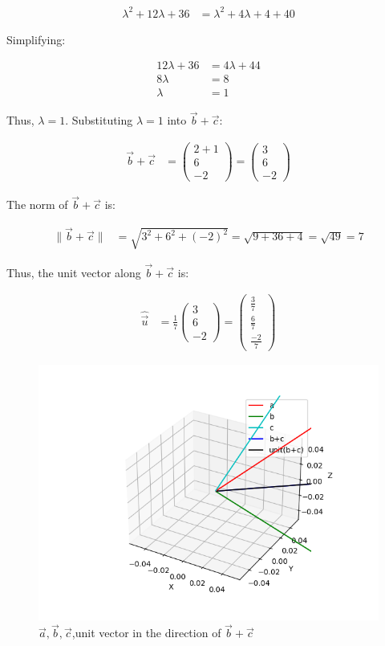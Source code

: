 \documentclass[journal]{IEEEtran}
\numberwithin{equation}{enumi}
\numberwithin{figure}{enumi}
\begin{document}
\begin{align}
\lambda^2 + 12\lambda + 36 &= \lambda^2 + 4\lambda + 4 + 40
\end{align}

Simplifying:

\begin{align}
12\lambda + 36 &= 4\lambda + 44 \\
8\lambda &= 8 \\
\lambda &= 1
\end{align}

Thus, $\lambda = 1$. Substituting $\lambda = 1$ into $\vec{b} + \vec{c}$:

\begin{align}
\vec{b} + \vec{c} &= \begin{pmatrix} 2 + 1 \\ 6 \\ -2 \end{pmatrix} = \begin{pmatrix} 3 \\ 6 \\ -2 \end{pmatrix}
\end{align}

The norm of $\vec{b} + \vec{c}$ is:

\begin{align}
\|\vec{b} + \vec{c}\| &= \sqrt{3^2 + 6^2 + (-2)^2} = \sqrt{9 + 36 + 4} = \sqrt{49} = 7
\end{align}

Thus, the unit vector along $\vec{b} + \vec{c}$ is:

\begin{align}
\hat{\vec{u}} &= \frac{1}{7} \begin{pmatrix} 3 \\ 6 \\ -2 \end{pmatrix} = \begin{pmatrix} \frac{3}{7} \\ \frac{6}{7} \\ \frac{-2}{7} \end{pmatrix}
\end{align}

\begin{figure}[h!]
	\centering
	\includegraphics[width=0.5\linewidth]{figs/Figure_1.png}
	\caption{ $\vec{a},\vec{b},\vec{c}$,unit vector in the direction of  $\vec{b}+\vec{c}$}
	\label{stemplot}
\end{figure}	
\end{document}
